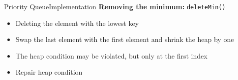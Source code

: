 
\begin{frame}{Priority Queue}{Implementation}
  \textbf{Removing the minimum:}
         {\color{Mittel-Blau}\texttt{deleteMin()}}
           \begin{figure}[!h]
    \begin{adjustbox}{height=0.275\linewidth}
    \end{adjustbox}
    \hspace{0.5em}\hspace{-1.5em}
    \begin{adjustbox}{height=0.275\linewidth}
    \end{adjustbox}
    \label{fig:priority_queue:impl_pop}%
  \end{figure}%
   \begin{itemize}
    \item<2->
     Deleting the element with the lowest key
    \item<3->
      Swap the last element with the first element and shrink the heap by one
    \item<4->
      The {\color{Mittel-Blau}heap condition} may be violated, but only at the
      first index
    \item<5->
      Repair {\color{Mittel-Blau}heap condition}
  \end{itemize}
\end{frame}


